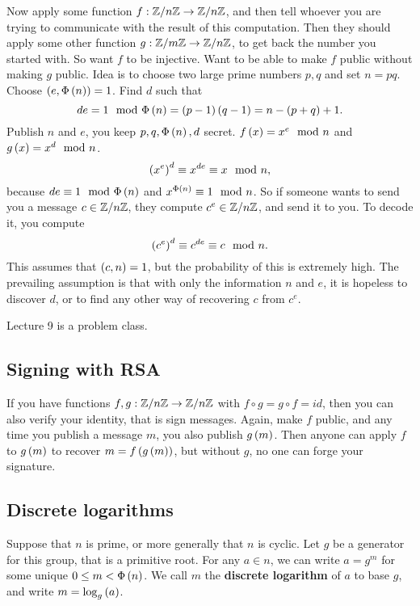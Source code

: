 Now apply some function $ f : \mathbb{Z} / n\mathbb{Z} \to \mathbb{Z} / n\mathbb{Z} $, and then tell whoever you are trying to communicate with the result of this computation. Then they should apply some other function $ g : \mathbb{Z} / m\mathbb{Z} \to \mathbb{Z} / n\mathbb{Z} $, to get back the number you started with. So want $ f $ to be injective. Want to be able to make $ f $ public without making $ g $ public. Idea is to choose two large prime numbers $ p, q $ and set $ n = pq $. Choose $ \left( e, \Phi\left( n \right) \right) = 1 $. Find $ d $ such that
$$ de = 1 \mod \Phi\left( n \right) = \left( p - 1 \right)\left( q - 1 \right) = n - \left( p + q \right) + 1. $$
Publish $ n $ and $ e $, you keep $ p, q, \Phi\left( n \right), d $ secret. $ f\left( x \right) = x^e \mod n $ and $ g\left( x \right) = x^d \mod n $.
$$ \left( x^e \right)^d \equiv x^{de} \equiv x \mod n, $$
because $ de \equiv 1 \mod \Phi\left( n \right) $ and $ x^{\Phi\left( n \right)} \equiv 1 \mod n $. So if someone wants to send you a message $ c \in \mathbb{Z} / n\mathbb{Z} $, they compute $ c^e \in \mathbb{Z} / n\mathbb{Z} $, and send it to you. To decode it, you compute
$$ \left( c^e \right)^d \equiv c^{de} \equiv c \mod n. $$
This assumes that $ \left( c, n \right) = 1 $, but the probability of this is extremely high. The prevailing assumption is that with only the information $ n $ and $ e $, it is hopeless to discover $ d $, or to find any other way of recovering $ c $ from $ c^e $.


Lecture 9 is a problem class.


\subsection{Signing with RSA}

If you have functions $ f, g : \mathbb{Z} / n\mathbb{Z} \to \mathbb{Z} / n\mathbb{Z} $ with $ f \circ g = g \circ f = id $, then you can also verify your identity, that is sign messages. Again, make $ f $ public, and any time you publish a message $ m $, you also publish $ g\left( m \right) $. Then anyone can apply $ f $ to $ g\left( m \right) $ to recover $ m = f\left( g\left( m \right) \right) $, but without $ g $, no one can forge your signature.

\subsection{Discrete logarithms}

Suppose that $ n $ is prime, or more generally that $ \unit{n} $ is cyclic. Let $ g $ be a generator for this group, that is a primitive root. For any $ a \in \unit{n} $, we can write $ a = g^m $ for some unique $ 0 \le m < \Phi\left( n \right) $. We call $ m $ the \textbf{discrete logarithm} of $ a $ to base $ g $, and write $ m = \log_g\left( a \right) $.

